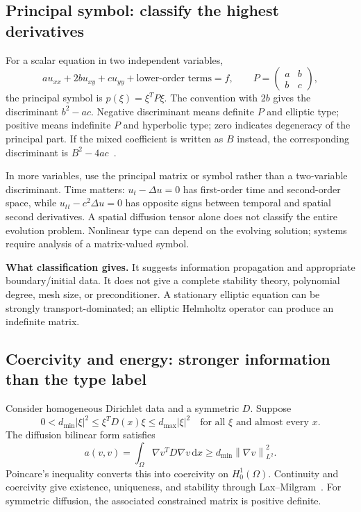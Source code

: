 \documentclass[11pt,a4paper]{article}
\newcommand{\dd}{\,\mathrm{d}}
\newcommand{\norm}[1]{\left\lVert #1\right\rVert}
\newcommand{\abs}[1]{\left\lvert #1\right\rvert}
\begin{document}
\subsection{Principal symbol: classify the highest derivatives}
For a scalar equation in two independent variables,
\begin{equation}
a u_{xx}+2b u_{xy}+c u_{yy}+\text{lower-order terms}=f,
\qquad P=\begin{pmatrix}a&b\\b&c\end{pmatrix},
\end{equation}
the principal symbol is $p(\xi)=\xi^TP\xi$. The convention with $2b$ gives the discriminant $b^2-ac$. Negative discriminant means definite $P$ and elliptic type; positive means indefinite $P$ and hyperbolic type; zero indicates degeneracy of the principal part. If the mixed coefficient is written as $B$ instead, the corresponding discriminant is $B^2-4ac$~\cite{mude}.

In more variables, use the principal matrix or symbol rather than a two-variable discriminant. Time matters: $u_t-\Delta u=0$ has first-order time and second-order space, while $u_{tt}-c^2\Delta u=0$ has opposite signs between temporal and spatial second derivatives. A spatial diffusion tensor alone does not classify the entire evolution problem. Nonlinear type can depend on the evolving solution; systems require analysis of a matrix-valued symbol.

\textbf{What classification gives.} It suggests information propagation and appropriate boundary/initial data. It does not give a complete stability theory, polynomial degree, mesh size, or preconditioner. A stationary elliptic equation can be strongly transport-dominated; an elliptic Helmholtz operator can produce an indefinite matrix.

\subsection{Coercivity and energy: stronger information than the type label}
Consider homogeneous Dirichlet data and a symmetric $D$. Suppose
\begin{equation}\label{eq:uniformellipticity}
0<d_{\min}\abs{\xi}^2\le\xi^TD(x)\xi
\le d_{\max}\abs{\xi}^2\quad\text{for all }\xi\text{ and almost every }x.
\end{equation}
The diffusion bilinear form satisfies
\begin{equation}
a(v,v)=\int_\Omega\nabla v^TD\nabla v\dd x
\ge d_{\min}\norm{\nabla v}_{L^2}^2.
\end{equation}
Poincare's inequality converts this into coercivity on $H^1_0(\Omega)$. Continuity and coercivity give existence, uniqueness, and stability through Lax--Milgram~\cite{femstability}. For symmetric diffusion, the associated constrained matrix is positive definite.
\end{document}
